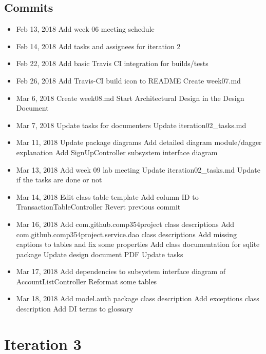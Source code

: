 \documentclass[12pt]{article}
\begin{document}
\subsection{Commits}
\begin{itemize}
    \item Feb 13, 2018
        \subitem [DOC] Add week 06 meeting schedule
    \item Feb 14, 2018
        \subitem [DOC] Add tasks and assignees for iteration 2
    \item Feb 22, 2018
        \subitem [BUILD] Add basic Travis CI integration for builds/tests
    \item Feb 26, 2018
        \subitem [BUILD] Add Travis-CI build icon to README
        \subitem Create week07.md
    \item Mar 6, 2018
        \subitem Create week08.md
        \subitem [DOC] Start Architectural Design in the Design Document
        \subitem
    \item Mar 7, 2018
        \subitem [DOC] Update tasks for documenters
        \subitem Update iteration02\_tasks.md
    \item Mar 11, 2018
        \subitem [DOC] Update package diagrams
        \subitem [DOC] Add detailed diagram module/dagger explanation
        \subitem [DOC] Add SignUpController subsystem interface diagram
    \item Mar 13, 2018
        \subitem Add week 09 lab meeting
        \subitem Update iteration02\_tasks.md
        \subitem Update if the tasks are done or not
    \item Mar 14, 2018
        \subitem [DOC] Edit class table template
        \subitem [FEAT] Add column ID to TransactionTableController
        \subitem [REVERT] Revert previous commit
    \item Mar 16, 2018
        \subitem [DOC] Add com.github.comp354project class descriptions
        \subitem [DOC] Add com.github.comp354project.service.dao class descriptions
        \subitem [DOC] Add missing captions to tables and fix some properties
        \subitem [DOC] Add class documentation for sqlite package
        \subitem [DOC] Update design document PDF
        \subitem [DOC] Update tasks
    \item Mar 17, 2018
        \subitem [DOC] Add dependencies to subsystem interface diagram of AccountListController
        \subitem [DOC] Reformat some tables
    \item Mar 18, 2018
        \subitem [DOC] Add model.auth package class description
        \subitem [DOC] Add exceptions class description
        \subitem [DOC] Add DI terms to glossary
\end{itemize}

\section{Iteration 3}
\end{document}
